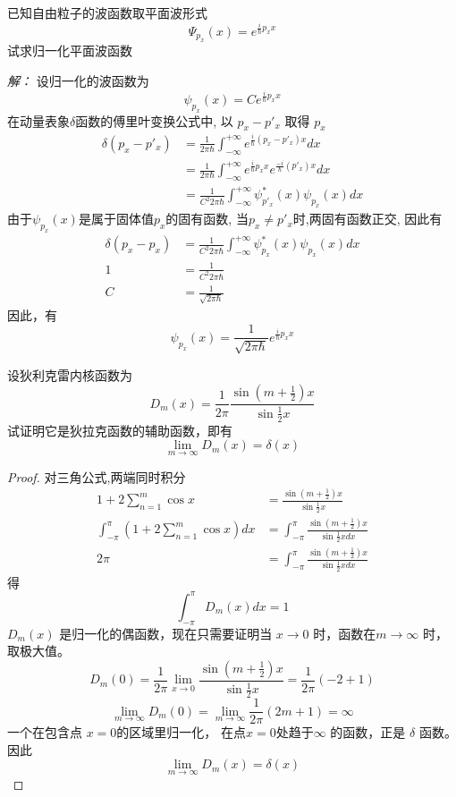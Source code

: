 \begin{example}
	已知自由粒子的波函数取平面波形式
	$$
	\Psi _{p_x}(x)= e^{\frac{i}{\hbar}p_x x} 
	$$ 
	试求归一化平面波函数
\end{example}
\emph{解：}
	设归一化的波函数为
	$$
	\psi _{p_x}(x)= C e^{\frac{i}{\hbar}p_x x} 
	$$ 
	在动量表象$\delta$函数的傅里叶变换公式中, 以 $p_x - p'_x$ 取得  $p_x$
	\[ 
		\begin{aligned}
			\delta(p_x-p'_x) &= \frac{1}{2\pi\hbar} \int_{-\infty}^{+\infty} e^{\frac{i}{\hbar}(p_x-p'_x) x}  dx\\
		 &= \frac{1}{2\pi\hbar} \int_{-\infty}^{+\infty} e^{\frac{i}{\hbar}p_x x} e^{\frac{-i}{\hbar}(p'_x) x} dx\\
		 &= \frac{1}{C^2 2\pi\hbar} \int_{-\infty}^{+\infty} \psi^* _{p'_x}(x) \psi_{p_x}(x) dx
		\end{aligned}
		\]
	由于$\psi _{p_x}(x)$是属于固体值$p_x$的固有函数, 当$p_x \ne p'_x$时,两固有函数正交, 因此有
	\[ 
		\begin{aligned}
			\delta(p_x-p_x) &= \frac{1}{C^2 2\pi\hbar} \int_{-\infty}^{+\infty} \psi^* _{p_x}(x) \psi_{p_x}(x) dx\\
			1 & = \frac{1}{C^2 2\pi\hbar} \\
			C  & = \frac{1}{\sqrt{2\pi\hbar} }
		\end{aligned}
		\]
	因此，有
	$$
	\psi _{p_x}(x)= \frac{1}{\sqrt{2\pi\hbar}} e^{\frac{i}{\hbar}p_x x} 
	$$


\begin{example}
	设狄利克雷内核函数为
	\[ D_m(x) =  \frac{1}{2\pi}\frac{\sin (m+\frac{1}{2})x}{ \sin\frac{1}{2}x } \]
	试证明它是狄拉克函数的辅助函数，即有
	\[\lim_{m \to \infty} D_m(x) =  \delta(x) \]
\end{example}
 \begin{proof}
	对三角公式,两端同时积分
	\[
	\begin{aligned}
		1+2\sum\limits_{n=1}^{m}\cos x &= \frac{\sin (m+\frac{1}{2})x}{\sin\frac{1}{2}x} \\ 
		\int_{-\pi} ^\pi (1+2\sum\limits_{n=1}^{m}\cos x) d x &= \int_{-\pi} ^\pi \frac{\sin (m+\frac{1}{2})x}{\sin\frac{1}{2}x d x  } \\
		2\pi &= \int_{-\pi} ^\pi \frac{\sin (m+\frac{1}{2})x}{\sin\frac{1}{2}x d x  }
	\end{aligned}	
	\]
	得 \[\int_{-\pi} ^\pi D_m(x) d x =1\]
	$ D_m(x)  $ 是归一化的偶函数，现在只需要证明当 $x \to 0$ 时，函数在$m \to \infty$ 时， 取极大值。
	\[D_m(0) = \frac{1}{2\pi} \lim_{x\to 0}\frac{\sin (m+\frac{1}{2})x}{ \sin\frac{1}{2}x } = \frac{1}{2\pi} (-2+1) \]
	\[\lim_{m \to \infty} D_m(0) = \lim_{m \to \infty} \frac{1}{2\pi} (2m+1) =\infty \]
	一个在包含点 $x=0$的区域里归一化， 在点$x=0$处趋于$\infty$ 的函数，正是 $\delta$ 函数。因此
	\[\lim_{m \to \infty} D_m(x) = \delta(x) \]
 \end{proof}
 

